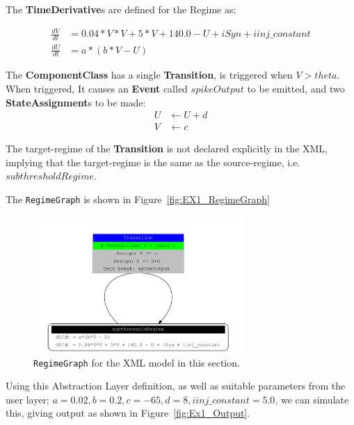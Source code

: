 \documentclass{article}
\newcommand{\ComponentClass}{{\bf{ComponentClass}}\xspace}
\newcommand{\StateAssignments}{{\bf{StateAssignment}}s\xspace}
\newcommand{\TimeDerivatives}{{\bf{TimeDerivative}}s\xspace}
\newcommand{\Event}{{\bf{Event}}\xspace}
\newcommand{\Transition}{{\bf{Transition}}\xspace}
\begin{document}
\noindent
The \TimeDerivatives are defined for the Regime as:

\begin{align}
\frac{dV}{dt} &= 0.04*V*V + 5*V + 140.0 - U + iSyn + iinj\_constant   \\
\frac{dU}{dt} &= a * ( b* V -U )
\end{align}

\noindent
The \ComponentClass has a single \Transition, is triggered when $V>theta$. When
triggered, It causes an \Event called $spikeOutput$ to be emitted, and two
\StateAssignments to be made:
\begin{align}
U &\leftarrow U + d \\
V &\leftarrow c
\end{align}

\noindent
The target-regime of the \Transition is not declared explicitly in the XML,
implying that the
target-regime is the same as the source-regime, i.e. $subthresholdRegime$.

The {\tt RegimeGraph} is shown in Figure~\ref{fig:EX1_RegimeGraph}

\begin{figure}[htb!]
\center
\includegraphics[width=8cm]{figures/example_IzRegimeTransGraph.pdf}
\protect\caption{{\tt RegimeGraph} for the XML model in this section.}
\label{fig:EX3_RegimeGraph}
\end{figure}

\noindent
Using this Abstraction Layer definition, as well as suitable parameters from the
user layer; $a=0.02, b=0.2, c=-65, d= 8, iinj\_constant= 5.0$, we can simulate
this, giving output as shown in Figure~\ref{fig:Ex1_Output}.
\end{document}
